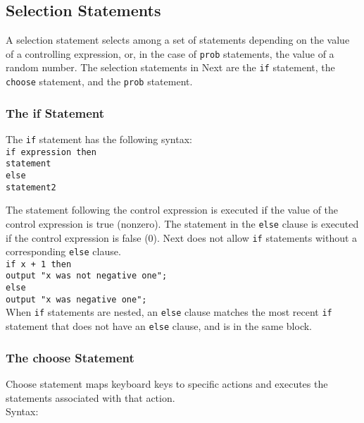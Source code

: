 \documentclass[12pt]{article}
\begin{document}
\subsection{Selection Statements}
A selection statement selects among a set of statements depending on the value of a controlling expression, or, in the case of \texttt{prob} statements, the value of a random number.  The selection statements in Next are the \texttt{if} statement, the \texttt{choose} statement, and the \texttt{prob} statement.

\subsubsection{The if Statement}

The \texttt{if} statement has the following syntax: \\

\texttt{if expression then \\
\indent \indent statement \\
\indent else \\
\indent \indent statement2 \\
}

\noindent The statement following the control expression is executed if the value of the control expression is true (nonzero).  The statement in the \texttt{else} clause is executed if the control expression is false (0).  Next does not allow \texttt{if} statements without a corresponding \texttt{else} clause.  \\

\texttt{if x + 1 then \\
\indent \indent output "x was not negative one";} \\
\indent \texttt{else \\
\indent \indent output "x was negative one";} \\

\noindent When \texttt{if} statements are nested, an \texttt{else} clause matches the most recent \texttt{if} statement that does not have an \texttt{else} clause, and is in the same block.

\subsubsection{The choose Statement}
Choose statement maps keyboard keys to specific actions and executes the statements associated with that action. \\

\noindent Syntax:
\end{document}
